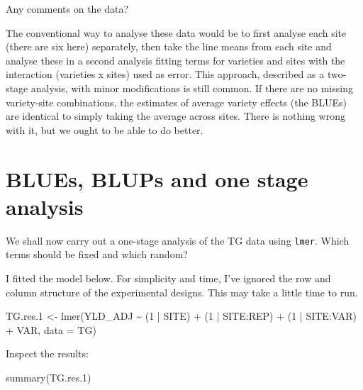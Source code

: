 \documentclass[
]{book}
\newenvironment{Shaded}{\begin{snugshade}}{\end{snugshade}}
\newcommand{\AttributeTok}[1]{\textcolor[rgb]{0.77,0.63,0.00}{#1}}
\newcommand{\DecValTok}[1]{\textcolor[rgb]{0.00,0.00,0.81}{#1}}
\newcommand{\FloatTok}[1]{\textcolor[rgb]{0.00,0.00,0.81}{#1}}
\newcommand{\FunctionTok}[1]{\textcolor[rgb]{0.00,0.00,0.00}{#1}}
\newcommand{\NormalTok}[1]{#1}
\newcommand{\OtherTok}[1]{\textcolor[rgb]{0.56,0.35,0.01}{#1}}
\newcommand{\SpecialCharTok}[1]{\textcolor[rgb]{0.00,0.00,0.00}{#1}}
\begin{document}
Any comments on the data?

The conventional way to analyse these data would be to first analyse each site (there are six here) separately, then take the line means from each site and analyse these in a second analysis fitting terms for varieties and sites with the interaction (varieties x sites) used as error. This approach, described as a two-stage analysis, with minor modifications is still common. If there are no missing variety-site combinations, the estimates of average variety effects (the BLUEs) are identical to simply taking the average across sites. There is nothing wrong with it, but we ought to be able to do better.

\hypertarget{blues-blups-and-one-stage-analysis}{%
\section{BLUEs, BLUPs and one stage analysis}\label{blues-blups-and-one-stage-analysis}}

We shall now carry out a one-stage analysis of the TG data using \texttt{lmer}. Which terms should be fixed and which random?

I fitted the model below. For simplicity and time, I've ignored the row and column structure of the experimental designs. This may take a little time to run.

\begin{Shaded}
\begin{Highlighting}[]
\NormalTok{TG.res}\FloatTok{.1} \OtherTok{\textless{}{-}} \FunctionTok{lmer}\NormalTok{(YLD\_ADJ }\SpecialCharTok{\textasciitilde{}}\NormalTok{ (}\DecValTok{1} \SpecialCharTok{|}\NormalTok{ SITE) }\SpecialCharTok{+}\NormalTok{ (}\DecValTok{1} \SpecialCharTok{|}\NormalTok{ SITE}\SpecialCharTok{:}\NormalTok{REP) }\SpecialCharTok{+}\NormalTok{ (}\DecValTok{1} \SpecialCharTok{|} 
\NormalTok{    SITE}\SpecialCharTok{:}\NormalTok{VAR) }\SpecialCharTok{+}\NormalTok{ VAR, }\AttributeTok{data =}\NormalTok{ TG)}
\end{Highlighting}
\end{Shaded}

Inspect the results:

\begin{Shaded}
\begin{Highlighting}[]
\FunctionTok{summary}\NormalTok{(TG.res}\FloatTok{.1}\NormalTok{)}
\end{Highlighting}
\end{Shaded}
\end{document}
